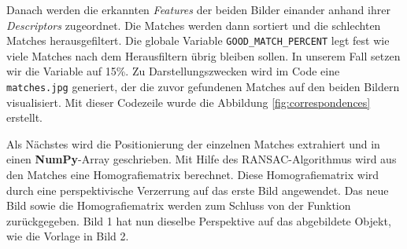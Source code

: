 Danach werden die erkannten \textit{Features} der beiden Bilder einander anhand ihrer \textit{Descriptors} zugeordnet. 
Die Matches werden dann sortiert und die schlechten Matches herausgefiltert. Die globale Variable \texttt{GOOD\_MATCH\_PERCENT} legt fest wie viele
Matches nach dem Herausfiltern übrig bleiben sollen. In unserem Fall setzen wir die Variable auf 15\%. Zu Darstellungszwecken wird im Code eine
\texttt{matches.jpg} generiert, der die zuvor gefundenen Matches auf den beiden Bildern visualisiert. Mit dieser Codezeile wurde die Abbildung 
\ref{fig:correspondences} erstellt.

Als Nächstes wird die Positionierung der einzelnen Matches extrahiert und in einen \textbf{NumPy}-Array geschrieben. Mit Hilfe des RANSAC-Algorithmus wird
aus den Matches eine Homografiematrix berechnet. Diese Homografiematrix wird durch eine perspektivische Verzerrung auf das erste Bild angewendet.
Das neue Bild sowie die Homografiematrix werden zum Schluss von der Funktion zurückgegeben. Bild 1 hat nun dieselbe Perspektive auf das abgebildete Objekt,
wie die Vorlage in Bild 2.

